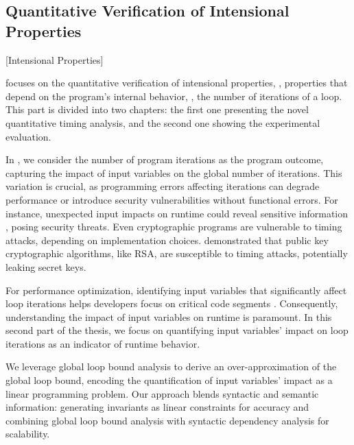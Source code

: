 \subsection{Quantitative Verification of Intensional Properties}[Intensional Properties]


 focuses on the quantitative verification of intensional properties, \ie, properties that depend on the program's internal behavior, \eg, the number of iterations of a loop.
This part is divided into two chapters: the first one presenting the novel quantitative timing analysis, and the second one showing the experimental evaluation.

In , we consider the number of program iterations as the program outcome, capturing the impact of input variables on the global number of iterations.
This variation is crucial, as programming errors affecting iterations can degrade performance or introduce security vulnerabilities without functional errors.
For instance, unexpected input impacts on runtime could reveal sensitive information , posing security threats.
Even cryptographic programs are vulnerable to timing attacks, depending on implementation choices.
 demonstrated that public key cryptographic algorithms, like RSA, are susceptible to timing attacks, potentially leaking secret keys.

For performance optimization, identifying input variables that significantly affect loop iterations helps developers focus on critical code segments .
Consequently, understanding the impact of input variables on runtime is paramount.
In this second part of the thesis, we focus on quantifying input variables' impact on loop iterations as an indicator of runtime behavior.

We leverage global loop bound analysis to derive an over-approximation of the global loop bound, encoding the quantification of input variables' impact as a linear programming problem.
Our approach blends syntactic and semantic information: generating invariants as linear constraints for accuracy and combining global loop bound analysis with syntactic dependency analysis  for scalability.

